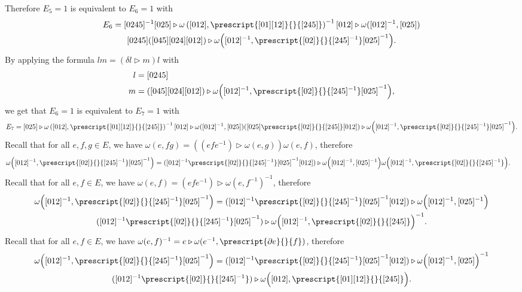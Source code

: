 \documentclass[a4paper, oneside]{amsart}
\numberwithin{equation}{subsection}
\theoremstyle{referencedlemma}
\theoremstyle{plain} %
\theoremstyle{remark}
\begin{document}
Therefore $E_5 = 1$ is equivalent to $E_6 = 1$ with 
\begin{multline*}
E_6 = 
 [0245]^{-1} [025]\triangleright \omega\left([012], \prescript{[01][12]}{}{[245]} \right)^{-1} [012] \triangleright \omega ([012]^{-1}, [025])\\
   [0245] ([045][024][012])\triangleright \omega \Big ([012]^{-1}, \prescript{[02]}{}{[245]^{-1}}[025]^{-1}\Big ) .
\end{multline*}
By applying the formula $lm = (\delta l\triangleright m)l$ with 
\begin{align*}
    l &= [0245]\\
    m &= ([045][024][012])\triangleright \omega\Big ([012]^{-1}, \prescript{[02]}{}{[245]^{-1}}[025]^{-1}\Big),
\end{align*}
we get that $E_6 = 1$ is equivalent to $E_7 = 1$ with 
\begin{equation*}
E_7 = 
 [025]\triangleright \omega\left([012], \prescript{[01][12]}{}{[245]} \right)^{-1} [012] \triangleright \omega ([012]^{-1}, [025])
   ([025]\prescript{[02]}{}{[245]}[012])\triangleright \omega \Big ([012]^{-1}, \prescript{[02]}{}{[245]^{-1}}[025]^{-1}\Big ) .
\end{equation*}
Recall that for all $e,f,g\in E$, we have $\omega(e,fg) =\left( (efe^{-1})\triangleright \omega(e,g)\right)\omega(e,f)$, therefore
\begin{align*}
\omega\Big ( [012]^{-1}, \prescript{[02]}{}{[245]^{-1}}[025]^{-1}\Big ) &= ([012]^{-1}\prescript{[02]}{}{[245]^{-1}}[025]^{-1}[012])\triangleright \omega \Big ([012]^{-1}, [025]^{-1}\Big ) \omega\Big ([012]^{-1}, \prescript{[02]}{}{[245]^{-1}}\Big ) .
\end{align*}
Recall that for all $e,f\in E$, we have $\omega(e,f) = (efe^{-1})\triangleright \omega(e, f^{-1})^{-1}$, therefore
\begin{multline*}
\omega\Big ( [012]^{-1}, \prescript{[02]}{}{[245]^{-1}}[025]^{-1}\Big ) = ([012]^{-1}\prescript{[02]}{}{[245]^{-1}}[025]^{-1}[012])\triangleright \omega \Big ( [012]^{-1}, [025]^{-1}\Big )\\
 ([012]^{-1}\prescript{[02]}{}{[245]^{-1}}[025]^{-1})\triangleright \omega \Big ([012]^{-1}, \prescript{[02]}{}{[245]}\Big )^{-1}.
\end{multline*}
Recall that for all $e,f\in E$, we have $\omega(e,f)^{-1} = e\triangleright \omega(e^{-1}, \prescript{\partial e}{}{f})$, therefore
\begin{multline*}
\omega\Big ( [012]^{-1}, \prescript{[02]}{}{[245]^{-1}}[025]^{-1}\Big ) = ([012]^{-1}\prescript{[02]}{}{[245]^{-1}}[025]^{-1}[012])\triangleright \omega \Big ( [012]^{-1}, [025]\Big )^{-1}\\
([012]^{-1}\prescript{[02]}{}{[245]^{-1}})\triangleright \omega\Big ( [012], \prescript{[01][12]}{}{[245]}\Big ).
\end{multline*}
\end{document}
